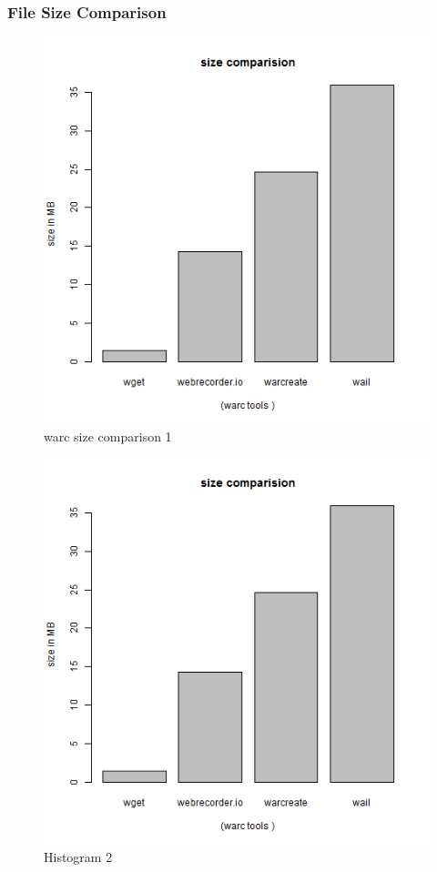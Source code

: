 \documentclass[12pt]{Report}
\begin{document}
\subsubsection{File Size Comparison}
\begin{figure}[ht]    
    \begin{center}
        \includegraphics[scale=0.60]{warcsizeComparision1.png}
        \caption{warc size comparison 1}
        \label{warc file size comparision}
    \end{center}
\end{figure}
\newpage
\begin{figure}[ht]    
    \begin{center}
        \includegraphics[scale=0.60]{warcsizeComparision1.png}
        \caption{Histogram 2}
        \label{warc file size comparision}
    \end{center}
\end{figure}
\newpage
\end{document}
